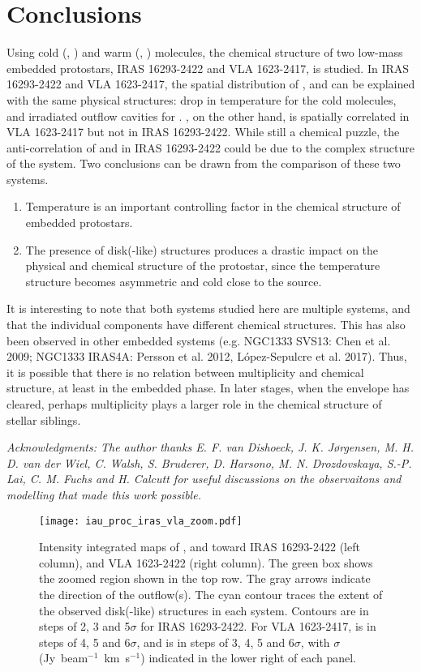 \documentclass{iaus}
\begin{document}
\section{Conclusions}
Using cold (, ) and warm (, ) molecules, the chemical structure of two low-mass embedded protostars, IRAS 16293-2422 and VLA 1623-2417, is studied.
In IRAS 16293-2422 and VLA 1623-2417, the spatial distribution of ,  and  can be explained with the same physical structures: drop in temperature for the cold molecules, and irradiated outflow cavities for .
, on the other hand, is spatially correlated in VLA 1623-2417 but not in IRAS 16293-2422.
While still a chemical puzzle, the anti-correlation of  and  in IRAS 16293-2422 could be due to the complex structure of the system.
Two conclusions can be drawn from the comparison of these two systems.
\begin{enumerate}
	\item Temperature is an important controlling factor in the chemical structure of embedded protostars.
	\item The presence of disk(-like) structures produces a drastic impact on the physical and chemical structure of the protostar, since the temperature structure becomes asymmetric and cold close to the source.
\end{enumerate}
It is interesting to note that both systems studied here are multiple systems, and that the individual components have different chemical structures.  
This has also been observed in other embedded systems (e.g. NGC1333 SVS13: Chen et al. 2009; NGC1333 IRAS4A: Persson et al. 2012, L{\'o}pez-Sepulcre et al. 2017).
Thus, it is possible that there is no relation between multiplicity and chemical structure, at least in the embedded phase. 
In later stages, when the envelope has cleared, perhaps multiplicity plays a larger role in the chemical structure of stellar siblings.

\textit{Acknowledgments: The author thanks E. F. van Dishoeck, J. K. J{\o}rgensen, M. H. D. van der Wiel, C. Walsh, S. Bruderer,  D. Harsono,  M. N. Drozdovskaya, S.-P. Lai, C. M. Fuchs and H. Calcutt for useful discussions on the observaitons and modelling that made this work possible.}

\begin{figure}
	\centering
	\texttt{[image: iau\_proc\_iras\_vla\_zoom.pdf]}
	\caption{Intensity integrated maps of ,  and  toward IRAS 16293-2422 (left column), and VLA 1623-2422 (right column). The green box shows the zoomed region shown in the top row. The gray arrows indicate the direction of the outflow(s). The cyan contour traces the extent of the observed disk(-like) structures in each system. Contours are in steps of 2, 3 and 5$\sigma$ for IRAS 16293-2422. For VLA 1623-2417,  is in steps of 4, 5 and 6$\sigma$, and  is in steps of 3, 4, 5 and 6$\sigma$, with $\sigma$ (Jy~beam$^{-1}$~km~s$^{-1}$) indicated in the lower right of each panel.}
\end{figure}
\end{document}
